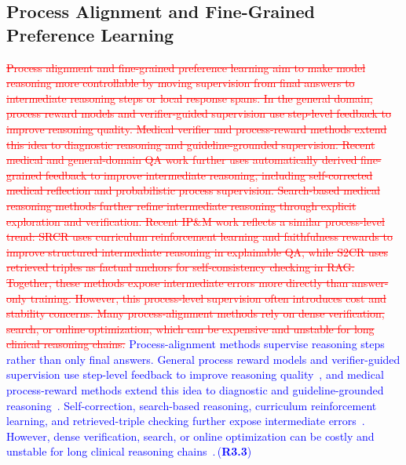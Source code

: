 \documentclass[a4paper,fleqn,doubleblind]{cas-sc}
\DeclareRobustCommand{\deleted}[1]{\textcolor{red}{\sout{#1}}}
\DeclareRobustCommand{\added}[1]{\textcolor{blue}{#1}}
\DeclareRobustCommand{\revtag}[1]{\textcolor{blue}{\scriptsize\,(\textbf{#1})}}
\begin{document}
\subsection{Process Alignment and Fine-Grained Preference Learning}
\deleted{Process alignment and fine-grained preference learning aim to make model reasoning more controllable by moving supervision from final answers to intermediate reasoning steps or local response spans. In the general domain, process reward models and verifier-guided supervision use step-level feedback to improve reasoning quality. Medical verifier and process-reward methods extend this idea to diagnostic reasoning and guideline-grounded supervision. Recent medical and general-domain QA work further uses automatically derived fine-grained feedback to improve intermediate reasoning, including self-corrected medical reflection and probabilistic process supervision. Search-based medical reasoning methods further refine intermediate reasoning through explicit exploration and verification. Recent IP\&M work reflects a similar process-level trend: SRCR uses curriculum reinforcement learning and faithfulness rewards to improve structured intermediate reasoning in explainable QA, while S2CR uses retrieved triples as factual anchors for self-consistency checking in RAG. Together, these methods expose intermediate errors more directly than answer-only training. However, this process-level supervision often introduces cost and stability concerns. Many process-alignment methods rely on dense verification, search, or online optimization, which can be expensive and unstable for long clinical reasoning chains.}
\added{Process-alignment methods supervise reasoning steps rather than only final answers. General process reward models and verifier-guided supervision use step-level feedback to improve reasoning quality~\cite{lightman2024let, wang2024math}, and medical process-reward methods extend this idea to diagnostic and guideline-grounded reasoning~\cite{xu2024reasoningdoctor, chen2025huatuogpto1, wang2025clinicalprm, yun2025medprm}. Self-correction, search-based reasoning, curriculum reinforcement learning, and retrieved-triple checking further expose intermediate errors~\cite{yang2025medrefl, zhong2026p2s, sun2025reasonmed, jiang2026meds3, ipm2026srcr, ipm2026s2cr}. However, dense verification, search, or online optimization can be costly and unstable for long clinical reasoning chains~\cite{zhou2022rainier, casper2023open}.}\revtag{R3.3}
\end{document}
